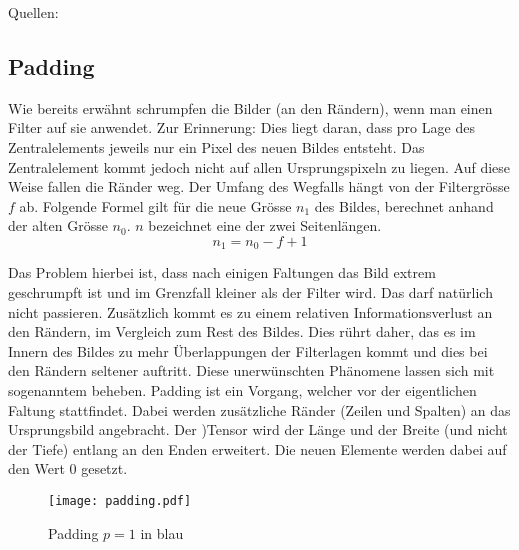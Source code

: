 \para{}
Quellen: \cite{Goodfellow-et-al-2016} \cite{deeplearning.ai:cnn}

\subsection{Padding}
Wie bereits erwähnt schrumpfen die Bilder (an den Rändern), wenn man einen Filter auf sie anwendet.
Zur Erinnerung: Dies liegt daran, dass pro Lage des Zentralelements jeweils nur ein Pixel
des neuen Bildes entsteht. Das Zentralelement kommt jedoch nicht auf allen
Ursprungspixeln zu liegen. Auf diese Weise fallen die Ränder weg. Der Umfang des
Wegfalls hängt von der Filtergrösse $f$ ab. Folgende Formel gilt für die
neue Grösse $n_1$ des Bildes, berechnet anhand der alten Grösse $n_0$. $n$ bezeichnet
eine der zwei Seitenlängen.
\begin{equation}
  n_1 = n_0 - f + 1
\end{equation}

Das Problem hierbei ist, dass nach einigen Faltungen das Bild extrem geschrumpft
ist und im Grenzfall kleiner als der Filter wird. Das darf natürlich nicht
passieren. Zusätzlich kommt es zu einem relativen Informationsverlust an den
Rändern, im Vergleich zum Rest des Bildes. Dies rührt daher,
das es im Innern des Bildes zu mehr Überlappungen der Filterlagen kommt und dies
bei den Rändern seltener auftritt.
\para{}
Diese unerwünschten Phänomene lassen sich mit sogenanntem  beheben. Padding ist ein
Vorgang, welcher vor der eigentlichen Faltung stattfindet. Dabei werden
zusätzliche Ränder (Zeilen und Spalten) an das Ursprungsbild angebracht. Der
)Tensor wird der Länge und der Breite (und nicht der Tiefe) entlang an den
Enden erweitert. Die neuen Elemente werden dabei auf den Wert $0$ gesetzt.

\begin{figure}[h!]
  \centering
  \texttt{[image: padding.pdf]}
  \caption{Padding $p=1$ in blau}
\end{figure}

